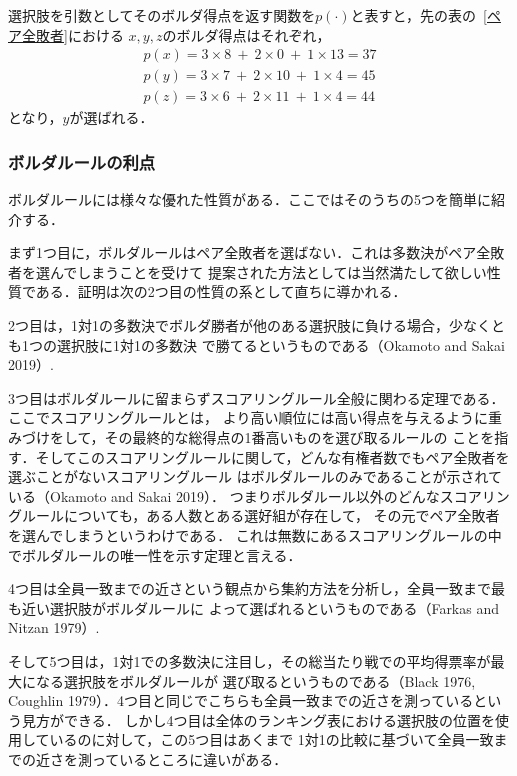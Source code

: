 \documentclass[dvipdfmx]{jsarticle}
\begin{document}
選択肢を引数としてそのボルダ得点を返す関数を$p(\cdot)$と表すと，先の表の~\ref{ペア全敗者}における
$x,y,z$のボルダ得点はそれぞれ，
\begin{align*}
  p(x) = 3 \times 8 \ + \ 2 \times 0 \ + \ 1 \times 13 = 37 \\
  p(y) = 3 \times 7 \ + \ 2 \times 10 \ + \ 1 \times 4 = 45 \\
  p(z) = 3 \times 6 \ + \ 2 \times 11 \ + \ 1 \times 4 = 44
\end{align*}
となり，$y$が選ばれる．

\subsubsection{ボルダルールの利点}\label{ボルダルールの利点}
ボルダルールには様々な優れた性質がある．ここではそのうちの5つを簡単に紹介する．

まず1つ目に，ボルダルールはペア全敗者を選ばない．これは多数決がペア全敗者を選んでしまうことを受けて
提案された方法としては当然満たして欲しい性質である．証明は次の2つ目の性質の系として直ちに導かれる．

2つ目は，1対1の多数決でボルダ勝者が他のある選択肢に負ける場合，少なくとも1つの選択肢に1対1の多数決
で勝てるというものである（Okamoto and Sakai 2019）.

3つ目はボルダルールに留まらずスコアリングルール全般に関わる定理である．ここでスコアリングルールとは，
より高い順位には高い得点を与えるように重みづけをして，その最終的な総得点の1番高いものを選び取るルールの
ことを指す．そしてこのスコアリングルールに関して，どんな有権者数でもペア全敗者を選ぶことがないスコアリングルール
はボルダルールのみであることが示されている（Okamoto and Sakai 2019）．
つまりボルダルール以外のどんなスコアリングルールについても，ある人数とある選好組が存在して，
その元でペア全敗者を選んでしまうというわけである．
これは無数にあるスコアリングルールの中でボルダルールの唯一性を示す定理と言える．

4つ目は全員一致までの近さという観点から集約方法を分析し，全員一致まで最も近い選択肢がボルダルールに
よって選ばれるというものである（Farkas and Nitzan 1979）.

そして5つ目は，1対1での多数決に注目し，その総当たり戦での平均得票率が最大になる選択肢をボルダルールが
選び取るというものである（Black 1976, Coughlin 1979）．4つ目と同じでこちらも全員一致までの近さを測っているという見方ができる．
しかし4つ目は全体のランキング表における選択肢の位置を使用しているのに対して，この5つ目はあくまで
1対1の比較に基づいて全員一致までの近さを測っているところに違いがある．
\end{document}

